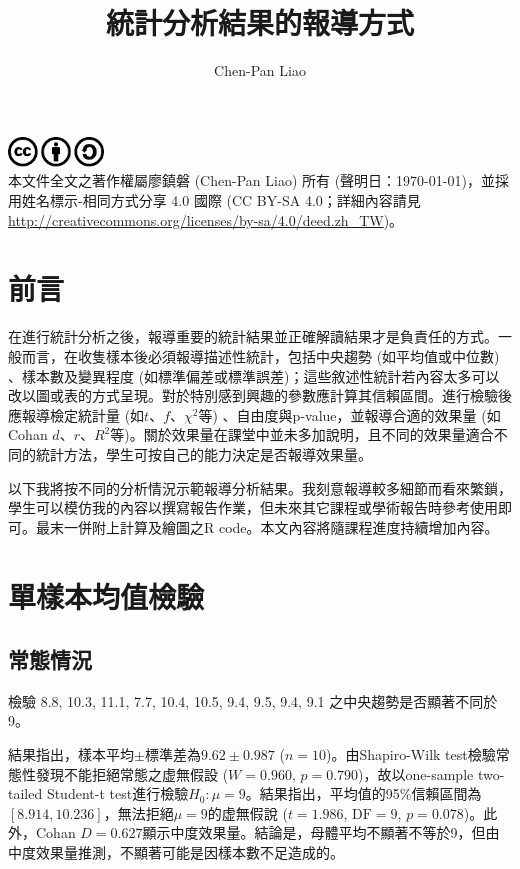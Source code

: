 \documentclass[12pt, a4paper, onecolumn]{article}
\title{統計分析結果的報導方式}
\author{Chen-Pan Liao}
\begin{document}
\maketitle

\noindent\includegraphics[width=1in]{cc.pdf}\\[2pt]
本文件全文之著作權屬廖鎮磐 (Chen-Pan Liao) 所有 (聲明日：\today)，並採用姓名標示-相同方式分享 4.0 國際 (CC BY-SA 4.0；詳細內容請見 \url{http://creativecommons.org/licenses/by-sa/4.0/deed.zh_TW})。

\tableofcontents

\section{前言}
在進行統計分析之後，報導重要的統計結果並正確解讀結果才是負責任的方式。一般而言，在收隻樣本後必須報導描述性統計，包括中央趨勢 (如平均值或中位數) 、樣本數及變異程度 (如標準偏差或標準誤差)；這些敘述性統計若內容太多可以改以圖或表的方式呈現。對於特別感到興趣的參數應計算其信賴區間。進行檢驗後應報導檢定統計量 (如$t$、$f$、$\chi^2$等) 、自由度與p-value，並報導合適的效果量 (如Cohan $d$、$r$、$R^2$等)。關於效果量在課堂中並未多加說明，且不同的效果量適合不同的統計方法，學生可按自己的能力決定是否報導效果量。

以下我將按不同的分析情況示範報導分析結果。我刻意報導較多細節而看來繁鎖，學生可以模仿我的內容以撰寫報告作業，但未來其它課程或學術報告時參考使用即可。最末一併附上計算及繪圖之R code。本文內容將隨課程進度持續增加內容。



\section{單樣本均值檢驗}
\subsection{常態情況}
檢驗 8.8, 10.3, 11.1, 7.7, 10.4, 10.5, 9.4, 9.5, 9.4, 9.1 之中央趨勢是否顯著不同於9。

結果指出，樣本平均$\pm$標準差為$9.62 \pm 0.987$ ($n = 10$)。由Shapiro-Wilk test檢驗常態性發現不能拒絕常態之虚無假設 ($W = 0.960$, $p = 0.790$)，故以one-sample two-tailed Student-t test進行檢驗$H_0: \mu=9$。結果指出，平均值的95\%信賴區間為$\left[8.914, 10.236\right]$，無法拒絕$\mu = 9$的虚無假說 ($t = 1.986$, $\text{DF} = 9$, $p = 0.078$)。此外，Cohan $D = 0.627$顯示中度效果量。結論是，母體平均不顯著不等於9，但由中度效果量推測，不顯著可能是因樣本數不足造成的。
\end{document}
